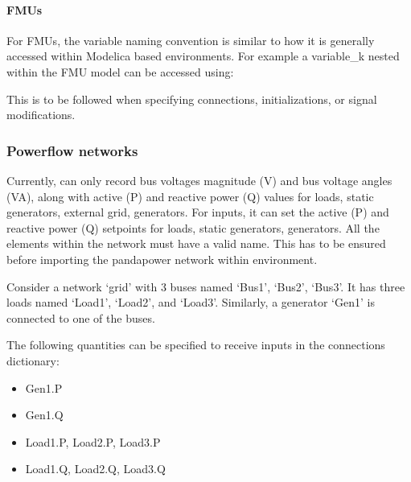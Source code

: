 \documentclass[letterpaper,10pt,english]{sphinxmanual}
\begin{document}
\paragraph{FMUs}
\label{\detokenize{add_simulator:fmus}}
For FMUs, the variable naming convention is similar to how it is generally accessed within Modelica based environments. For example a variable\_k nested within the FMU model can be accessed using:

\begin{sphinxVerbatim}[commandchars=\\\{\}]
\end{sphinxVerbatim}

This is to be followed when specifying connections, initializations, or signal modifications.


\subsubsection{Powerflow networks}
\label{\detokenize{add_simulator:powerflow-networks}}
Currently,  can only record bus voltages magnitude (V) and bus voltage angles (VA), along with active (P) and reactive power (Q) values for loads, static generators, external grid, generators. For inputs, it can set the active (P) and reactive power (Q) setpoints for loads, static generators, generators. All the elements within the network must have a valid name. This has to be ensured before importing the pandapower network within  environment.

Consider a network ‘grid’ with 3 buses named ‘Bus1’, ‘Bus2’, ‘Bus3’. It has three loads named ‘Load1’, ‘Load2’, and ‘Load3’. Similarly, a generator ‘Gen1’ is connected to one of the buses.

The following quantities can be specified to receive inputs in the connections dictionary:
\begin{itemize}
\item {} 
Gen1.P

\item {} 
Gen1.Q

\item {} 
Load1.P, Load2.P, Load3.P

\item {} 
Load1.Q, Load2.Q, Load3.Q

\end{itemize}
\end{document}
